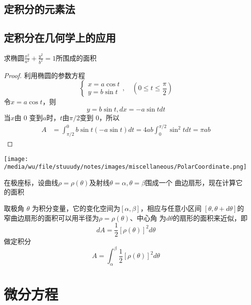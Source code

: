 \documentclass[11pt]{article}
\begin{document}
\subsection{定积分的元素法}
\label{sec:orge41cc68}
\subsection{定积分在几何学上的应用}
\label{sec:org992d9e6}
\begin{examplle}[]
求椭圆\(\frac{x^2}{a^2}+\frac{y^2}{b^2}=1\)所围成的面积
\end{examplle}

\begin{proof}
利用椭圆的参数方程
\begin{equation*}
\begin{cases}
x=a\cos t \\
y=b\sin t
\end{cases},\quad (0\le t\le\frac{\pi}{2})
\end{equation*}
令\(x=a\cos t\)，则
\begin{equation*}
y=b\sin t,dx=-a\sin t dt
\end{equation*}
当\(x\)由 0 变到\(a\)时，\(t\)由\(\pi/2\)变到 0，所以
\begin{align*}
A&=\int_{\pi/2}^0b\sin t(-a\sin t)dt=4ab\int_0^{\pi/2}\sin^2tdt=\pi ab
\end{align*}
\end{proof}

\begin{center}
\texttt{[image: /media/wu/file/stuuudy/notes/images/miscellaneous/PolarCoordinate.png]}
\end{center}

在极座标，设曲线\(\rho=\rho(\theta)\)及射线\(\theta=\alpha,\theta=\beta\)围成一个
曲边扇形，现在计算它的面积

取极角 \(\theta\) 为积分变量，它的变化空间为\([\alpha,\beta]\)，相应与任意小区间
\([\theta,\theta+d\theta]\)的窄曲边扇形的面积可以用半径为\(\rho=\rho(\theta)\)、中心角
为\(d\theta\)的扇形的面积来近似，即
\begin{equation*}
dA=\frac{1}{2}[\rho(\theta)]^2d\theta
\end{equation*}
做定积分
\begin{equation*}
A=\int_\alpha^\beta\frac{1}{2}[\rho(\theta)]^2d\theta
\end{equation*}
\section{微分方程}
\label{sec:orgc1a6326}
\end{document}
